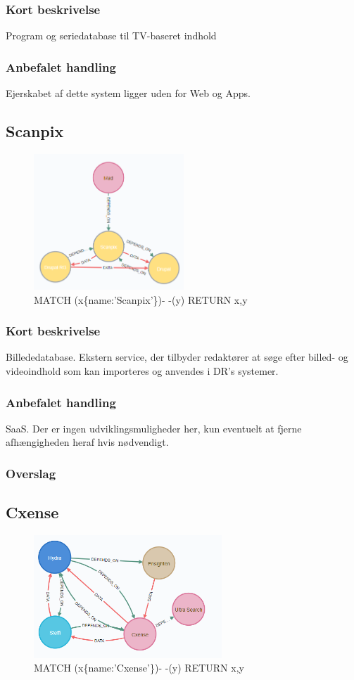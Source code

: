\documentclass{article}
\begin{document}
\subsubsection*{Kort beskrivelse}
Program og seriedatabase til TV-baseret indhold
\subsubsection*{Anbefalet handling}
Ejerskabet af dette system ligger uden for Web og Apps.



\subsection{Scanpix}
\begin{figure}[h]
\includegraphics[width=160pt]{Scanpix.PNG}
\caption{MATCH (x\{name:'Scanpix'\})- -(y) RETURN x,y}
\end{figure}
\subsubsection*{Kort beskrivelse}
Billededatabase. Ekstern service, der tilbyder redaktører at søge efter billed- og videoindhold som kan importeres og anvendes i DR's systemer.
\subsubsection*{Anbefalet handling}
SaaS. Der er ingen udviklingsmuligheder her, kun eventuelt at fjerne afhængigheden heraf hvis nødvendigt.
\subsubsection*{Overslag}


\subsection{Cxense}
\begin{figure}[h]
\includegraphics[width=200pt]{Cxense.PNG}
\caption{MATCH (x\{name:'Cxense'\})- -(y) RETURN x,y}
\end{figure}
\end{document}
